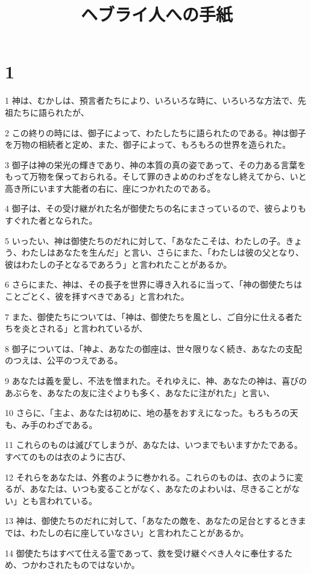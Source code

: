 

\title{ヘブライ人への手紙}


\chapter{1}

\par 1 神は、むかしは、預言者たちにより、いろいろな時に、いろいろな方法で、先祖たちに語られたが、
\par 2 この終りの時には、御子によって、わたしたちに語られたのである。神は御子を万物の相続者と定め、また、御子によって、もろもろの世界を造られた。
\par 3 御子は神の栄光の輝きであり、神の本質の真の姿であって、その力ある言葉をもって万物を保っておられる。そして罪のきよめのわざをなし終えてから、いと高き所にいます大能者の右に、座につかれたのである。
\par 4 御子は、その受け継がれた名が御使たちの名にまさっているので、彼らよりもすぐれた者となられた。
\par 5 いったい、神は御使たちのだれに対して、「あなたこそは、わたしの子。きょう、わたしはあなたを生んだ」と言い、さらにまた、「わたしは彼の父となり、彼はわたしの子となるであろう」と言われたことがあるか。
\par 6 さらにまた、神は、その長子を世界に導き入れるに当って、「神の御使たちはことごとく、彼を拝すべきである」と言われた。
\par 7 また、御使たちについては、「神は、御使たちを風とし、ご自分に仕える者たちを炎とされる」と言われているが、
\par 8 御子については、「神よ、あなたの御座は、世々限りなく続き、あなたの支配のつえは、公平のつえである。
\par 9 あなたは義を愛し、不法を憎まれた。それゆえに、神、あなたの神は、喜びのあぶらを、あなたの友に注ぐよりも多く、あなたに注がれた」と言い、
\par 10 さらに、「主よ、あなたは初めに、地の基をおすえになった。もろもろの天も、み手のわざである。
\par 11 これらのものは滅びてしまうが、あなたは、いつまでもいますかたである。すべてのものは衣のように古び、
\par 12 それらをあなたは、外套のように巻かれる。これらのものは、衣のように変るが、あなたは、いつも変ることがなく、あなたのよわいは、尽きることがない」とも言われている。
\par 13 神は、御使たちのだれに対して、「あなたの敵を、あなたの足台とするときまでは、わたしの右に座していなさい」と言われたことがあるか。
\par 14 御使たちはすべて仕える霊であって、救を受け継ぐべき人々に奉仕するため、つかわされたものではないか。

